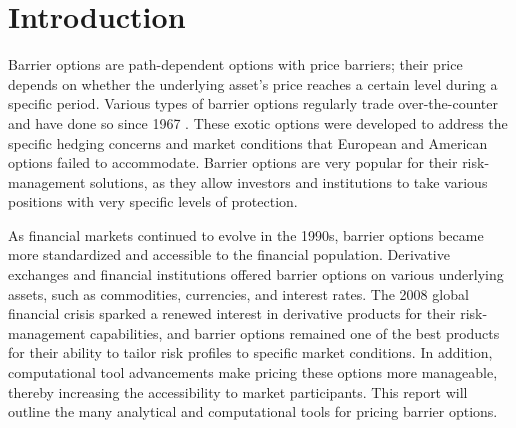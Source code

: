 %


\chapter{Introduction}
\everymath{\displaystyle}
\captionsetup[figure]{font=large}
Barrier options are path-dependent options with price barriers; their price depends on whether the underlying asset's price reaches a certain level during a specific period. Various types of barrier options regularly trade over-the-counter and have done so since 1967 \cite{JohnRubinstein1985}. These exotic options were developed to address the specific hedging concerns and market conditions that European and American options failed to accommodate. Barrier options are very popular for their risk-management solutions, as they allow investors and institutions to take various positions with very specific levels of protection.

As financial markets continued to evolve in the 1990s, barrier options became more standardized and accessible to the financial population. Derivative exchanges and financial institutions offered barrier options on various underlying assets, such as commodities, currencies, and interest rates. The 2008 global financial crisis sparked a renewed interest in derivative products for their risk-management capabilities, and barrier options remained one of the best products for their ability to tailor risk profiles to specific market conditions. In addition, computational tool advancements make pricing these options more manageable, thereby increasing the accessibility to market participants. This report will outline the many analytical and computational tools for pricing barrier options.